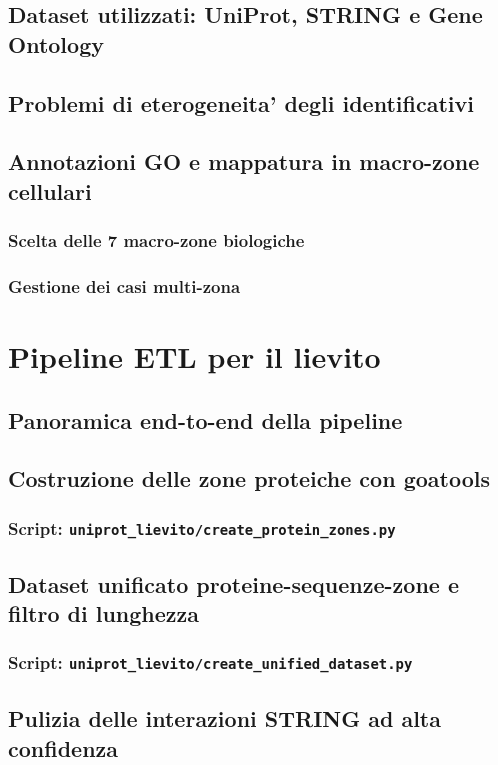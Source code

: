 \documentclass[12pt,a4paper,oneside]{report} %
\begin{document}
\section{Dataset utilizzati: UniProt, STRING e Gene Ontology}
\section{Problemi di eterogeneita' degli identificativi}
\section{Annotazioni GO e mappatura in macro-zone cellulari}
\subsection{Scelta delle 7 macro-zone biologiche}
\subsection{Gestione dei casi multi-zona}

\chapter{Pipeline ETL per il lievito}
\section{Panoramica end-to-end della pipeline}
\section{Costruzione delle zone proteiche con goatools}
\subsection{Script: \texttt{uniprot\_lievito/create\_protein\_zones.py}}
\section{Dataset unificato proteine-sequenze-zone e filtro di lunghezza}
\subsection{Script: \texttt{uniprot\_lievito/create\_unified\_dataset.py}}
\section{Pulizia delle interazioni STRING ad alta confidenza}
\end{document}
